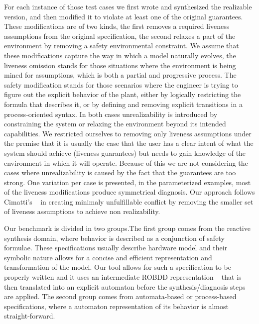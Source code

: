 For each instance of those test cases we first wrote and synthesized the realizable version, and then modified it
to violate at least one of the original guarantees. 
These modifications are of two kinds, the first removes a required liveness assumptions from the original specification, the second relaxes a part of the environment by removing a safety environmental constraint. We assume that these modifications capture the way in which a model naturally evolves, the liveness omission stands for those situations where the environment is being mined for assumptions, which is both a partial and progressive process. The safety modification stands for those scenarios where the engineer is trying to figure out the explicit behavior of the plant, either by logically restricting the formula that describes it, or by defining and removing explicit transitions in a process-oriented syntax. In both cases unrealizability is introduced by constraining the system or relaxing the environment beyond its intended capabilities. We restricted ourselves to removing only liveness assumptions under the premise that it is usually the case that the user has a clear intent of what the system should achieve (liveness guarantees) but needs to gain knowledge of the environment in which it will operate.  Because of this we are not considering the cases where unrealizability is caused by the fact that the guarantees are too strong. One variation per case is presented, in the parameterized examples, most of the liveness modifications produce symmetrical diagnosis. Our approach follows Cimatti's ~\cite{DBLP:conf/vmcai/CimattiRST08} in creating minimaly unfulfillable conflict by removing the smaller set of liveness assumptions to achieve non realizability.
 
Our benchmark is divided in two groups.The first group comes from the reactive synthesis domain, where behavior is described as a conjunction of safety formulae. These specifications usually describe hardware model and their symbolic nature allows for a concise and efficient representation and transformation of the model.  Our tool allows for such a specification to be properly written and it uses an intermediate ROBDD representation ~\cite{brace1990efficient} that is then translated into an explicit automaton before the synthesis/diagnosis steps are applied. The second group comes from automata-based or process-based specifications, where a automaton representation of its behavior is almost straight-forward.

